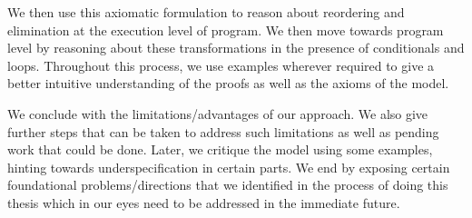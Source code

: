 We then use this axiomatic formulation to reason about reordering and elimination at the execution level of program.
We then move towards program level by reasoning about these transformations in the presence of conditionals and loops. 
Throughout this process, we use examples wherever required to give a better intuitive understanding of the proofs as well as the axioms of the model. 
    
We conclude with the limitations/advantages of our approach.
We also give further steps that can be taken to address such limitations as well as pending work that could be done.
Later, we critique the model using some examples, hinting towards underspecification in certain parts.
We end by exposing certain foundational problems/directions that we identified in the process of doing this thesis which in our eyes need to be addressed in the immediate future.


